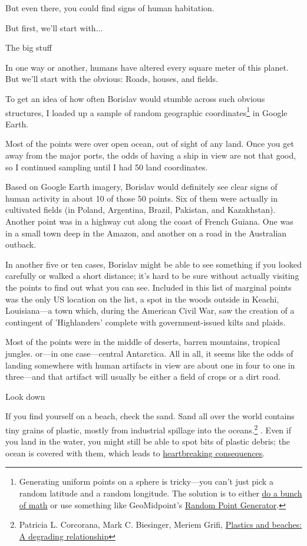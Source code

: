 {{But even there, you could find signs of human habitation.}

{But first, we'll start with...}

{The big stuff}

{In one way or another, humans have altered every square meter of this planet. But we'll start with the obvious: Roads, houses, and fields.}

{To get an idea of how often Borislav would stumble across such obvious structures, I loaded up a sample of random geographic coordinates{\footnote{Generating uniform points on a sphere is tricky—you can't just pick a random latitude and a random longitude. The solution is to either \href{http://en.wikipedia.org/wiki/N-sphere\#Generating\_random\_points}{do a bunch of math} or use something like GeoMidpoint's \href{http://www.geomidpoint.com/random/} {Random Point Generator}.} } in Google Earth.}

{Most of the points were over open ocean, out of sight of any land. Once you get away from the major ports, the odds of having a ship in view are not that good, so I continued sampling until I had 50 land coordinates.}

{Based on Google Earth imagery, Borislav would definitely see clear signs of human activity in about 10 of those 50 points. Six of them were actually in cultivated fields (in Poland, Argentina, Brazil, Pakistan, and Kazakhstan). Another point was in a highway cut along the coast of French Guiana. One was in a small town deep in the Amazon, and another on a road in the Australian outback.}

{In another five or ten cases, Borislav might be able to see something if you looked carefully or walked a short distance; it's hard to be sure without actually visiting the points to find out what you can see. Included in this list of marginal points was the only US location on the list, a spot in the woods outside in Keachi, Louisiana—a town which, during the American Civil War, saw the creation of a contingent of 'Highlanders' complete with government-issued kilts and plaids.}

{Most of the points were in the middle of deserts, barren mountains, tropical jungles. or—in one case—central Antarctica. All in all, it seems like the odds of landing somewhere with human artifacts in view are about one in four to one in three—and that artifact will usually be either a field of crops or a dirt road.}

{Look down}

{If you find yourself on a beach, check the sand. Sand all over the world contains tiny grains of plastic, mostly from industrial spillage into the oceans.{\footnote{Patricia L. Corcorana, Mark C. Biesinger, Meriem Griﬁ, \href{http://www.surfacesciencewestern.com/pdf/0909\_mpb09\_biesinger.pdf}{Plastics and beaches: A degrading relationship}} }. Even if you land in the water, you might still be able to spot bits of plastic debris; the ocean is covered with them, which leads to \href{http://blogs.scientificamerican.com/observations/2009/11/11/intolerable-beauty-plastic-garbage-kills-the-albatross/} {heartbreaking consequences}.}

}
